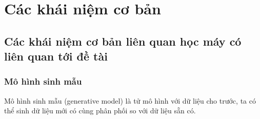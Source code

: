 
\chapter{Các khái niệm cơ bản}

%


\section{Các khái niệm cơ bản liên quan học máy có liên quan tới đề tài}
\subsection{Mô hình sinh mẫu}
Mô hình sinh mẫu (generative model) là tử mô hình với dữ liệu cho trước, ta có thể sinh dữ liệu mới có cùng phân phối so với dữ liệu sẵn có.



